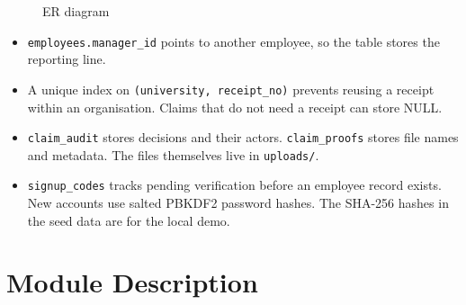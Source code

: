 \documentclass[12pt,a4paper]{report}
\begin{document}
\begin{figure}[H]
\caption{ER diagram}
\label{fig:er}
\end{figure}

\begin{itemize}
  \item \texttt{employees.manager\_id} points to another employee, so the table stores the reporting line.
  \item A unique index on \texttt{(university, receipt\_no)} prevents reusing a receipt within an organisation. Claims that do not need a receipt can store NULL.
  \item \texttt{claim\_audit} stores decisions and their actors. \texttt{claim\_proofs} stores file names and metadata. The files themselves live in \texttt{uploads/}.
  \item \texttt{signup\_codes} tracks pending verification before an employee record exists. New accounts use salted PBKDF2 password hashes. The SHA-256 hashes in the seed data are for the local demo.
\end{itemize}

\section{Module Description}
\end{document}
